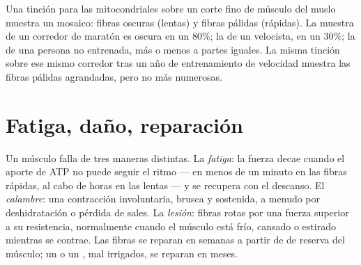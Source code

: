 \begin{example}\label{ex:g10:muscles-and-joints:biopsy}
Una tinción para las  mitocondriales sobre un corte fino de
músculo del muslo muestra un mosaico: fibras oscuras (lentas) y fibras
pálidas (rápidas). La muestra de un corredor de maratón es oscura en un
80\%; la de un velocista, en un 30\%; la de una persona no entrenada,
más o menos a partes iguales. La misma tinción sobre ese mismo corredor
tras un año de entrenamiento de velocidad muestra las fibras pálidas
agrandadas, pero no más numerosas.
\end{example}

\section{Fatiga, daño, reparación}

\begin{proposition}\label{prop:g10:muscles-and-joints:limits}
Un músculo falla de tres maneras distintas. La \emph{fatiga}: la fuerza
decae cuando el aporte de ATP no puede seguir el ritmo --- en menos de
un minuto en las fibras rápidas, al cabo de horas en las lentas --- y se
recupera con el descanso. El \emph{calambre}: una contracción
involuntaria, brusca y sostenida, a menudo por deshidratación o pérdida
de sales. La \emph{lesión}: fibras rotas por una fuerza superior a su
resistencia, normalmente cuando el músculo está frío, cansado o
estirado mientras se contrae. Las fibras se reparan en semanas a partir
de  de reserva del músculo; un  o un , mal
irrigados, se reparan en meses.
\end{proposition}
\admitted

